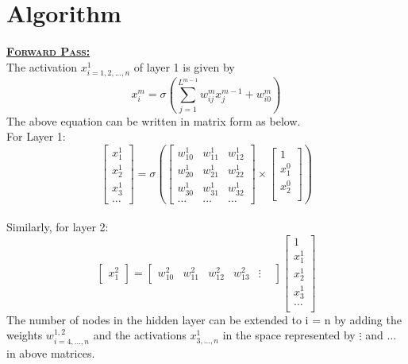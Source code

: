 \documentclass[a4paper,11pt]{article}
\begin{document}
\section{Algorithm}
\large{\textbf{\underline{\textsc{Forward Pass:}}}}\\
The activation $x^1_{i = 1,2,...,n}$ of layer 1 is given by \\
\begin{equation} 
 x_i^m = \sigma
 \left(
 \sum_{j=1}^{L^{m-1}} w_{ij}^m x_j^{m-1} + w_{i0}^m
 \right)
\end{equation}
The above equation can be written in matrix form as below.\\
For Layer 1:
$$
\left[
\begin{matrix}
	x_1^1 \\ x_2^1 \\ x_3^1 \\\hdots
	\end{matrix}
\right]
=
\sigma
\left(
\left[
\begin{matrix}
	w_{10}^1 & w_{11}^1 & w_{12}^1\\
	w_{20 }^1& w_{21}^1 & w_{22}^1 \\
	w_{30}^1 & w_{31}^1 & w_{32}^1\\
	\hdots & \hdots & \hdots
\end{matrix}
\right]
\times
\left[
\begin{matrix}
	1\\ x_1^0 \\x_2^0\\
\end{matrix}
\right]
\right)
$$
\\
Similarly, for layer 2:
$$
\left[
\begin{matrix}
	x_{1}^2
\end{matrix}
\right]
=
\left[
\begin{matrix}
w_{10}^2 & w_{11}^2 & w_{12}^2 & w_{13}^2  & \vdots &
\end{matrix}
\right]
\left[
\begin{matrix}
1\\x_1^1\\x_2^1\\x_3^1 \\ \hdots \\  
\end{matrix}
\right]
$$
The number of nodes in the hidden layer can be extended to i = n by adding the weights $w^{1,2}_{i=4,...,n}$ and the activations $x^{1}_{3,...,n}$ in the space represented by $\vdots$ and $\hdots$ in above matrices.\\\\
\end{document}
